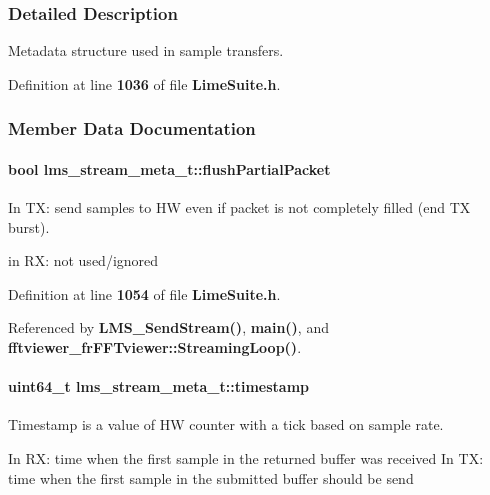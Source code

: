 \subsubsection{Detailed Description}
Metadata structure used in sample transfers. 

Definition at line {\bf 1036} of file {\bf Lime\+Suite.\+h}.



\subsubsection{Member Data Documentation}
\paragraph[{flush\+Partial\+Packet}]{\setlength{\rightskip}{0pt plus 5cm}bool lms\+\_\+stream\+\_\+meta\+\_\+t\+::flush\+Partial\+Packet}\label{structlms__stream__meta__t_ae7bf66b19ddf4cfe6af896a5e3aa140a}


In TX\+: send samples to HW even if packet is not completely filled (end TX burst). 

in RX\+: not used/ignored 

Definition at line {\bf 1054} of file {\bf Lime\+Suite.\+h}.



Referenced by {\bf L\+M\+S\+\_\+\+Send\+Stream()}, {\bf main()}, and {\bf fftviewer\+\_\+fr\+F\+F\+Tviewer\+::\+Streaming\+Loop()}.

\paragraph[{timestamp}]{\setlength{\rightskip}{0pt plus 5cm}uint64\+\_\+t lms\+\_\+stream\+\_\+meta\+\_\+t\+::timestamp}\label{structlms__stream__meta__t_a06b58547700227e13a55a3cfd49963b5}


Timestamp is a value of HW counter with a tick based on sample rate. 

In RX\+: time when the first sample in the returned buffer was received In TX\+: time when the first sample in the submitted buffer should be send 

